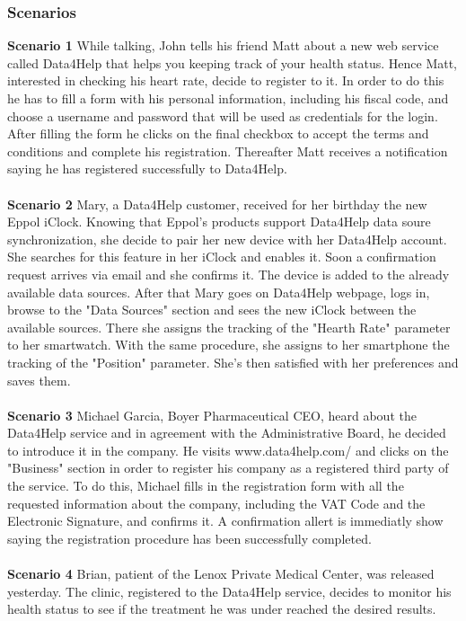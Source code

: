 \subsubsection{Scenarios}
\textbf{Scenario 1}
While talking, John tells his friend Matt about a new web service called Data4Help that helps you keeping track of your health status. Hence Matt, interested in checking his heart rate, decide to register to it. In order to do this he has to fill a form with his personal information, including his fiscal code, and choose a username and password  that will be used as credentials for the login. 
After filling the form he clicks on the final checkbox to accept the terms and conditions and complete his registration.
Thereafter Matt receives a notification saying he has registered successfully to Data4Help.
\\
\\
\textbf{Scenario 2}
Mary, a Data4Help customer, received for her birthday the new Eppol iClock. Knowing that Eppol's products support Data4Help data soure synchronization, she decide to pair her new device with her Data4Help account. She searches for this feature in her iClock and enables it.
Soon a confirmation request arrives via email and she confirms it. The device is added to the already available data sources.
After that Mary goes on Data4Help webpage, logs in, browse to the "Data Sources" section and sees the new iClock between the available sources. There she assigns the tracking of the "Hearth Rate" parameter to her smartwatch. With the same procedure, she assigns to her smartphone the tracking of the "Position" parameter.
She's then satisfied with her preferences and saves them.
\\
\\
\textbf{Scenario 3}
Michael Garcia, Boyer Pharmaceutical CEO, heard about the Data4Help service and in agreement with the Administrative Board, he decided to introduce it in the company. He visits  www.data4help.com/ and clicks on the "Business" section in order to register his company as a registered third party of the service. To do this, Michael fills in the registration form with all the requested information about the company, including the VAT Code and the Electronic Signature, and confirms it. A confirmation allert is immediatly show saying the registration procedure has been successfully completed.
\\
\\
\textbf{Scenario 4}
Brian, patient of the Lenox Private Medical Center, was released  yesterday. The clinic, registered to the Data4Help service, decides to monitor his health status to see if the treatment he was under reached the desired results.
